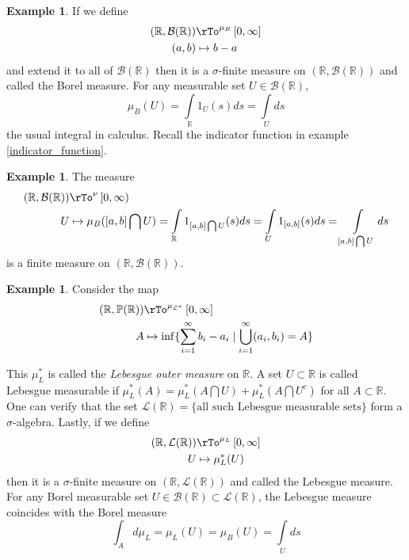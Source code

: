 \documentclass[12pt]{amsart}
\theoremstyle{definition}
\newtheorem{example}[theorem]{Example}
\begin{document}
\begin{example} \label{Borelmeasure} If we define
\begin{align*}
(\mathbb{R}, \mathcal{B}(\mathbb{R})) & \rTo^{\mu_B} \, [0, \infty] \\
(a,b) & \mapsto b-a
\end{align*}
and extend it to all of $\mathcal{B}(\mathbb{R})$ then it is a $\sigma$-finite measure on $(\mathbb{R}, \mathcal{B}(\mathbb{R}))$ and called the Borel measure. For any measurable set $U \in \mathcal{B}(\mathbb{R})$,
$$\mu_B(U) = \int\limits_{\mathbb{R}} 1_U(s) ds = \int\limits_U ds$$
the usual integral in calculus. Recall the indicator function in example \ref{indicator_function}.
\end{example}

\begin{example} \label{finitemeasure} The measure
\begin{align*}
(\mathbb{R}, \mathcal{B}(\mathbb{R})) & \rTo^{\nu} \,[0,\infty) \\
U & \mapsto \mu_B([a,b] \bigcap U) = \int\limits_{\mathbb{R}} 1_{[a,b] \bigcap U}(s) ds = \int\limits_U 1_{[a,b]}(s) ds = \int\limits_{[a,b] \bigcap U} ds
\end{align*}
is a finite measure on $(\mathbb{R}, \mathcal{B}(\mathbb{R}))$.
\end{example}

\begin{example} \label{Lebesguemeasure} Consider the map
\begin{align*}
(\mathbb{R}, \mathbb{P}(\mathbb{R})) & \rTo^{\mu_{\mathcal{L}^*}} \, [0,\infty] \\
A & \mapsto \inf\{\sum\limits_{i = 1}^{\infty} b_i - a_i \mid \bigcup\limits_{i = 1}^{\infty} (a_i, b_i)  = A\}
\end{align*}

This $\mu_L^*$ is called the \textit{Lebesgue outer measure} on $\mathbb{R}$. A set $U \subset \mathbb{R}$ is called Lebesgue measurable if $\mu_L^*(A) =  \mu_L^*(A \bigcap U) + \mu_L^*(A \bigcap U^c)$ for all $A \subset \mathbb{R}$. One can verify that the set $\mathcal{L}(\mathbb{R}) = \{\text{all such Lebesgue measurable sets}\}$ form a $\sigma$-algebra. Lastly, if we define
\begin{align*}
(\mathbb{R}, \mathcal{L}(\mathbb{R})) & \rTo^{\mu_L} \,[0,\infty] \\
U & \mapsto \mu_L^*(U)
\end{align*} 
then it is a $\sigma$-finite measure on $(\mathbb{R}, \mathcal{L}(\mathbb{R}))$ and called the Lebesgue measure. For any Borel measurable set $U \in \mathcal{B}(\mathbb{R}) \subset \mathcal{L}(\mathbb{R})$, the Lebesgue measure coincides with the Borel measure
$$\int_A d\mu_L = \mu_L(U) = \mu_B(U) = \int\limits_U ds$$
\end{example}
\end{document}
